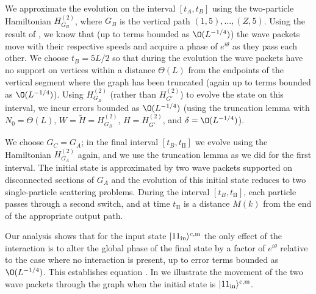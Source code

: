\documentclass[../thesis-main/thesis-main]{subfiles}
\begin{document}
We approximate the evolution on the interval $[t_A,t_B]$ using the two-particle  Hamiltonian $H_{G_B}^{(2)}$, where $G_B$  is the vertical path $(1,5),\ldots,(Z,5)$. Using the result of , we know that (up to terms bounded as $\O(L^{-{1}/{4}})$) the wave packets move with their respective speeds and acquire a phase of $e^{i\theta}$ as they pass each other. We choose $t_B={5L}/{2}$ so that during the evolution the wave packets have no support on vertices within a distance $\Theta(L)$ from the endpoints of the vertical segment where the graph has been truncated (again up to terms bounded as $\O(L^{-{1}/{4}})$). Using $H_{G_B}^{(2)}$ (rather than $H_{G'}^{(2)}$) to evolve the state on this interval, we incur errors bounded as $\O(L^{-{1}/{4}})$ (using the truncation lemma with $N_0=\Theta(L)$, $W=\tilde{H}=H_{G_B}^{(2)}$, $H=H_{G'}^{(2)}$, and $\delta=\O(L^{-{1}/{4}})$).

We choose $G_C=G_A$; in the final interval $[t_{B},t_{\mathrm{II}}]$ we evolve using the Hamiltonian  $H_{G_A}^{(2)}$ again, and we use the truncation lemma as we did for the first interval. The initial state is approximated by two wave packets supported on disconnected sections of $G_A$ and the evolution of this initial state reduces to two single-particle scattering problems. During the interval $[t_B,t_{\mathrm{II}}]$, each particle passes through a second switch, and at time $t_{\mathrm{II}}$ is a distance $M(k)$ from the end of the appropriate output path. 

Our analysis shows that for the input state $|11_\text{in}\rangle^{c,\mathrm{m}}$ the only effect of the interaction is to alter the global phase of the final state by a factor of $e^{i\theta}$ relative to the case where no interaction is present, up to error terms bounded as $\O(L^{-{1}/{4}})$. This establishes equation . In  we illustrate the movement of the two wave packets through the graph when the initial state is $|11_\text{in}\rangle^{c,\mathrm{m}}$.
\end{document}
